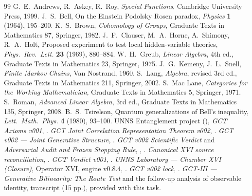 \documentclass[11pt,a4paper]{article}
\theoremstyle{plain}
\theoremstyle{definition}
\begin{document}
\begin{thebibliography}{99}\small
 G.~E.~Andrews, R.~Askey, R.~Roy, \emph{Special Functions}, Cambridge University Press, 1999.
 J.~S.~Bell, On the Einstein Podolsky Rosen paradox, \emph{Physics} \textbf{1} (1964), 195--200.
 K.~S.~Brown, \emph{Cohomology of Groups}, Graduate Texts in Mathematics 87, Springer, 1982.
 J.~F.~Clauser, M.~A.~Horne, A.~Shimony, R.~A.~Holt, Proposed experiment to test local hidden-variable theories, \emph{Phys.\ Rev.\ Lett.} \textbf{23} (1969), 880--884.
 W.~H.~Greub, \emph{Linear Algebra}, 4th ed., Graduate Texts in Mathematics 23, Springer, 1975.
 J.~G.~Kemeny, J.~L.~Snell, \emph{Finite Markov Chains}, Van Nostrand, 1960.
 S.~Lang, \emph{Algebra}, revised 3rd ed., Graduate Texts in Mathematics 211, Springer, 2002.
 S.~Mac Lane, \emph{Categories for the Working Mathematician}, Graduate Texts in Mathematics 5, Springer, 1971.
 S.~Roman, \emph{Advanced Linear Algebra}, 3rd ed., Graduate Texts in Mathematics 135, Springer, 2008.
 B.~S.~Tsirelson, Quantum generalizations of Bell's inequality, \emph{Lett.\ Math.\ Phys.} \textbf{4} (1980), 93--100.
\medskip
{} UNNS Entanglement project (), \emph{GCT Axioms v001}, .
 \emph{GCT Joint Correlation Representation Theorem v002}, .
 \emph{GCT v002 --- Joint Generative Structure}, .
 \emph{GCT v002 Scientific Verdict} and \emph{Adversarial Audit and Frozen Stopping Rule}, , .
 \emph{Canonical XVI source reconciliation}, .
 \emph{GCT Verdict v001}, .
 \emph{UNNS Laboratory --- Chamber XVI (Closure)}, Operator XVI, engine v0.8.4, .
 \emph{GCT v002 lock}, .
 \emph{GCT-III --- Generative Bilinearity: The Route Test} and the follow-up analysis of observable identity, transcript  (15 pp.), provided with this task.
\end{thebibliography}
\end{document}
